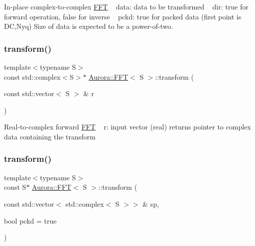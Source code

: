 In-\/place complex-\/to-\/complex \hyperlink{class_aurora_1_1_f_f_t}{F\+FT} ~\newline
data\+: data to be transformed ~\newline
dir\+: true for forward operation, false for inverse ~\newline
pckd\+: true for packed data (first point is DC,Nyq) Size of data is expected to be a power-\/of-\/two. \mbox{\label{class_aurora_1_1_f_f_t_a51ed1e25953c12b7f4cc145d19ee5cd8}} 
\subsubsection{\texorpdfstring{transform()}{transform()}\hspace{0.1cm}{\footnotesize\ttfamily [2/3]}}
{\footnotesize\ttfamily template$<$typename S$>$ \\
const std\+::complex$<$S$>$$\ast$ \hyperlink{class_aurora_1_1_f_f_t}{Aurora\+::\+F\+FT}$<$ S $>$\+::transform (\begin{DoxyParamCaption}\item[{const std\+::vector$<$ S $>$ \&}]{r }\end{DoxyParamCaption})\hspace{0.3cm}{\ttfamily [inline]}}

Real-\/to-\/complex forward \hyperlink{class_aurora_1_1_f_f_t}{F\+FT} ~\newline
r\+: input vector (real) returns pointer to complex data containing the transform \mbox{\label{class_aurora_1_1_f_f_t_aa0912d8abdeb15ff84d82a5cc59cb150}} 
\subsubsection{\texorpdfstring{transform()}{transform()}\hspace{0.1cm}{\footnotesize\ttfamily [3/3]}}
{\footnotesize\ttfamily template$<$typename S$>$ \\
const S$\ast$ \hyperlink{class_aurora_1_1_f_f_t}{Aurora\+::\+F\+FT}$<$ S $>$\+::transform (\begin{DoxyParamCaption}\item[{const std\+::vector$<$ std\+::complex$<$ S $>$$>$ \&}]{sp,  }\item[{bool}]{pckd = {\ttfamily true} }\end{DoxyParamCaption})\hspace{0.3cm}{\ttfamily [inline]}}

